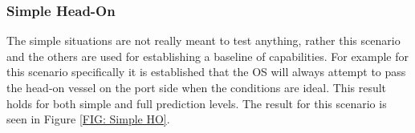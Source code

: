
\clearpage
\subsubsection{Simple Head-On}
The simple situations are not really meant to test anything, rather this scenario and the others are used for establishing
a baseline of capabilities. For example for this scenario specifically it is established that the OS will always attempt to
pass the head-on vessel on the port side when the conditions are ideal. This result holds for both simple and
full prediction levels. The result for this scenario is seen in Figure \ref{FIG: Simple HO}.

